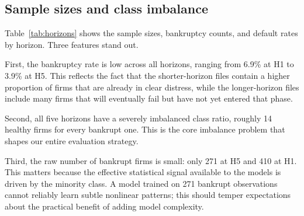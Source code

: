 \documentclass[12pt,a4paper]{article}
\begin{document}
\begin{table}[H]
\centering
\caption{Polish macroeconomic context, 2000--2013.$^{*}$}
\label{tab:polish-macro}
\small
{}
\caption*{\footnotesize $^{*}$ GDP growth and CPI inflation are annual
percentages; unemployment is the registered year-end rate; the NBP reference
rate is the year-end policy rate. Sources: World Bank national accounts, GUS
(registered unemployment), National Bank of Poland.}
\end{table}

\subsection{Sample sizes and class imbalance}

Table~\ref{tab:horizons} shows the sample sizes, bankruptcy counts, and
default rates by horizon. Three features stand out.

First, the bankruptcy rate is low across all horizons, ranging from 6.9\%
at H1 to 3.9\% at H5. This reflects the fact that the shorter-horizon files
contain a higher proportion of firms that are already in clear distress,
while the longer-horizon files include many firms that will eventually fail
but have not yet entered that phase.

Second, all five horizons have a severely imbalanced class ratio, roughly
14 healthy firms for every bankrupt one. This is the core imbalance problem
that shapes our entire evaluation strategy.

Third, the raw number of bankrupt firms is small: only 271 at H5 and 410 at
H1. This matters because the effective statistical signal available to the
models is driven by the minority class. A model trained on 271 bankrupt
observations cannot reliably learn subtle nonlinear patterns; this should
temper expectations about the practical benefit of adding model complexity.
\end{document}
